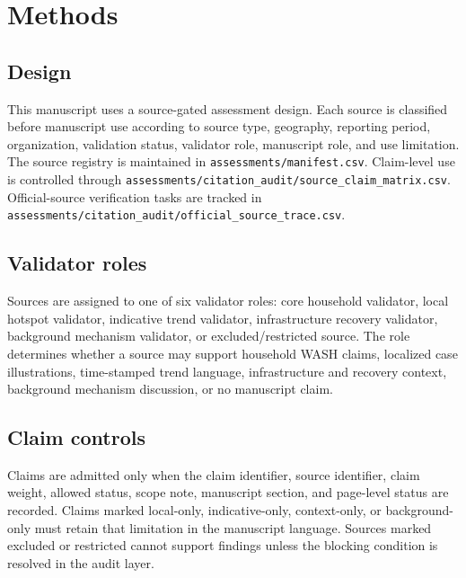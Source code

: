 
\section{Methods}

\subsection{Design}

This manuscript uses a source-gated assessment design. Each source is classified before manuscript use according to source type, geography, reporting period, organization, validation status, validator role, manuscript role, and use limitation. The source registry is maintained in \texttt{assessments/manifest.csv}. Claim-level use is controlled through \texttt{assessments/citation\_audit/source\_claim\_matrix.csv}. Official-source verification tasks are tracked in \texttt{assessments/citation\_audit/official\_source\_trace.csv}.

\subsection{Validator roles}

Sources are assigned to one of six validator roles: core household validator, local hotspot validator, indicative trend validator, infrastructure recovery validator, background mechanism validator, or excluded/restricted source. The role determines whether a source may support household WASH claims, localized case illustrations, time-stamped trend language, infrastructure and recovery context, background mechanism discussion, or no manuscript claim.

\subsection{Claim controls}

Claims are admitted only when the claim identifier, source identifier, claim weight, allowed status, scope note, manuscript section, and page-level status are recorded. Claims marked local-only, indicative-only, context-only, or background-only must retain that limitation in the manuscript language. Sources marked excluded or restricted cannot support findings unless the blocking condition is resolved in the audit layer.

